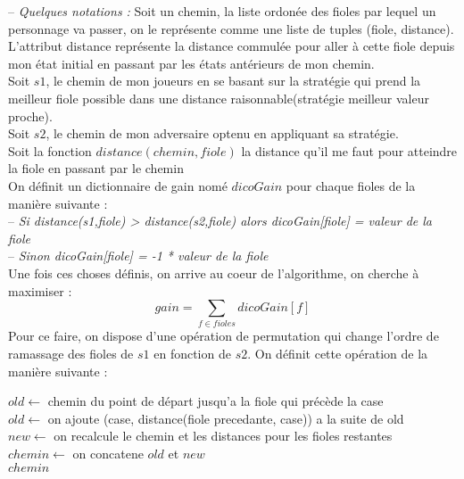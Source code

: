 \documentclass[11pt]{article}
\begin{document}
-- {\itshape Quelques notations :}
Soit un chemin, la liste ordonée des fioles par lequel un personnage va passer, on le représente comme une liste de tuples (fiole, distance). \\
L'attribut distance représente la distance commulée pour aller à cette fiole depuis mon état initial en passant par les états antérieurs de mon chemin.\\
Soit $s1$, le chemin de mon joueurs en se basant sur la stratégie qui prend la meilleur fiole possible dans une distance raisonnable(stratégie meilleur valeur proche). \\
Soit $s2$, le chemin de mon adversaire optenu en appliquant sa stratégie. \\
Soit la fonction $distance(chemin,fiole)$ la distance qu'il me faut pour atteindre la fiole en passant par le chemin \\
On définit un dictionnaire de gain nomé $dicoGain$ pour chaque fioles de la manière suivante : \\
-- {\itshape Si distance(s1,fiole) > distance(s2,fiole) alors dicoGain[fiole] = valeur de la fiole} \\
-- {\itshape Sinon dicoGain[fiole] = -1 * valeur de la fiole } \\
Une fois ces choses définis, on arrive au coeur de l'algorithme, on cherche à maximiser : \\
\[ gain = \sum_{f \in fioles} dicoGain[f] \]
Pour ce faire, on dispose d'une opération de permutation qui change l'ordre de ramassage des fioles de  $s1$ en fonction de $s2$.
On définit cette opération de la manière suivante : \\



\newpage

\SetAlgoVlined
\begin{algorithm}
    $old \leftarrow $ chemin du point de départ jusqu'a la fiole qui précède la case  \\
    $old \leftarrow $ on ajoute (case, distance(fiole precedante, case)) a la suite de old\\
    $new \leftarrow $ on recalcule le chemin et les distances pour les fioles restantes \\
    $chemin \leftarrow $ on concatene $old$ et  $new$  \\
    \Retour $chemin$
\end{algorithm}
\end{document}
